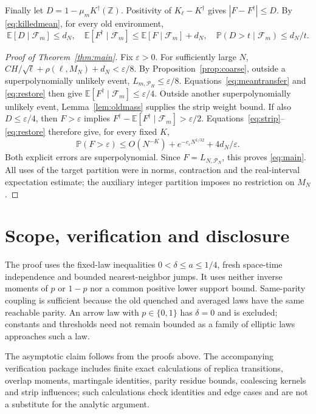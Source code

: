 \documentclass[11pt]{article}
\newcommand{\EE}{\mathbb E}
\newcommand{\PP}{\mathbb P}
\newcommand{\ZZ}{\mathbb Z}
\newcommand{\cF}{\mathcal F}
\newcommand{\cP}{\mathcal P}
\begin{document}
Finally let $D=1-\mu_mK^\dagger(\ZZ)$.
Positivity of $K_\ell-K^\dagger$ gives $|F-F^\dagger|\leq D$.
By \eqref{eq:killedmean}, for every old environment,
\begin{equation}\label{eq:restore}
 \EE[D\mid\cF_m]\leq d_N,\quad
 \EE[F^\dagger\mid\cF_m]\leq\EE[F\mid\cF_m]+d_N,\quad
 \PP(D>t\mid\cF_m)\leq d_N/t .
\end{equation}

\begin{proof}[Proof of Theorem~\ref{thm:main}]
Fix $\varepsilon>0$.
For sufficiently large $N$,
$CH/\sqrt\ell+\rho(\ell,M_N)+d_N<\varepsilon/8$.
By Proposition~\ref{prop:coarse}, outside a superpolynomially
unlikely event, $L_{m,\cP_H}\leq\varepsilon/8$.
Equations~\eqref{eq:meantransfer} and \eqref{eq:restore} then give
$\EE[F^\dagger\mid\cF_m]\leq\varepsilon/4$.
Outside another superpolynomially unlikely event,
Lemma~\ref{lem:oldmass} supplies the strip weight bound.
If also $D\leq\varepsilon/4$, then $F>\varepsilon$ implies
$F^\dagger-\EE[F^\dagger\mid\cF_m]>\varepsilon/2$.
Equations~\eqref{eq:strip}--\eqref{eq:restore} therefore give,
for every fixed $K$,
\[
 \PP(F>\varepsilon)
    \leq O(N^{-K})+e^{-c_\varepsilon N^{1/32}}
                       +4d_N/\varepsilon.
\]
Both explicit errors are superpolynomial. Since $F=L_{N,\cP_N}$,
this proves \eqref{eq:main}. All uses of the target partition were
in norms, contraction and the real-interval expectation estimate;
the auxiliary integer partition imposes no restriction on $M_N$.
\end{proof}

\section{Scope, verification and disclosure}

The proof uses the fixed-law inequalities
$0<\delta\leq a\leq1/4$, fresh space-time independence and bounded
nearest-neighbor jumps. It uses neither inverse moments of $p$ or
$1-p$ nor a common positive lower support bound.
Same-parity coupling is sufficient because the old quenched and
averaged laws have the same reachable parity. An arrow law with
$p\in\{0,1\}$ has $\delta=0$ and is excluded; constants and
thresholds need not remain bounded as a family of elliptic laws
approaches such a law.

The asymptotic claim follows from the proofs above.
The accompanying verification package includes finite exact calculations
of replica transitions, overlap moments,
martingale identities, parity residue bounds, coalescing kernels
and strip influences;
such calculations check identities and edge cases and are not a
substitute for the analytic argument.
\end{document}
